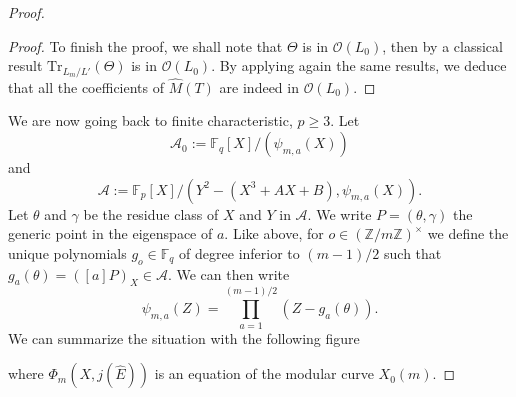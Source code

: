 \documentclass[12pt]{article}
\theoremstyle{plain}
\theoremstyle{definition}
\def\Z{\ensuremath{\mathbb{Z}}}
\def\F{\ensuremath{\mathbb{F}}}
\begin{document}
\begin{proof}
\begin{proof}
To finish the proof, we shall note that $\Theta$ is in $\mathcal{O}(L_0)$, then
by a classical result $\text{Tr}_{L_m/L'}(\Theta)$ is in $\mathcal{O}(L_0)$. By
applying again the same results, we deduce that all the coefficients of $\widehat{M}(T)$
are indeed in $\mathcal{O}(L_0)$.
\end{proof}

We are now going back to finite characteristic, $p\geq3$. Let
\begin{equation}
\mathcal{A}_0:=\F_q[X]/(\psi_{m,a}(X))
\end{equation}
and
\begin{equation}
\mathcal{A}:=\F_p[X]/(Y^2-(X^3+AX+B),\psi_{m,a}(X)).
\end{equation}
Let $\theta$ and $\gamma$ be the residue class of $X$ and $Y$ in $\mathcal{A}$.
We write $P = (\theta, \gamma)$ the generic point in the eigenspace of $a$. 
Like above, for $o\in(\Z/m\Z)^{\times}$ we define the unique polynomials 
$g_o\in\F_q$ of degree inferior to $(m-1)/2$ such that $g_a(\theta)= 
([a]P)_X \in\mathcal{A}$. We can then write 
\begin{equation}
\psi_{m,a}(Z) = \prod_{a=1}^{(m-1)/2}{(Z - g_a(\theta))}.
\end{equation}
We can summarize the situation with the following figure
\begin{center}
\end{center}
where $\Phi_m(X,j(\widehat{E}))$ is an equation of the modular curve $X_0(m)$.


\end{proof}
\end{document}
